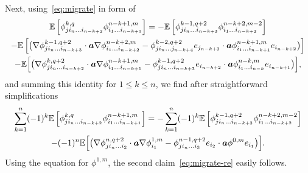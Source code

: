 \documentclass[10pt]{amsart}
\theoremstyle{plain}
\theoremstyle{definition}
\numberwithin{equation}{section}
\newcommand{\ee}{e}
\newcommand{\Aa}{\boldsymbol a}
\newcommand{\expec}[1]{\mathbb{E}\left[ #1 \right]}
\newcommand{\Bexpec}[1]{\mathbb{E}\Bigl[ #1 \Bigr]}
\begin{document}
Next, using~\eqref{eq:migrate} in form of
\begin{multline*}
\expec{\phi^{k,q}_{ji_n\ldots i_{n-k+2}}\phi^{n-k+1,m}_{i_1\ldots i_{n-k+1}}}=-\expec{\phi^{k-1,q+2}_{ji_n\ldots i_{n-k+3}}\phi^{n-k+2,m-2}_{i_1\ldots i_{n-k+2}}}\\
-\expec{\big(\nabla\phi^{k-1,q+2}_{ji_n\ldots i_{n-k+3}}\cdot\Aa\nabla\phi^{n-k+2,m}_{i_1\ldots i_{n-k+2}}-\phi^{k-2,q+2}_{ji_n\ldots j_{n-k+4}}\ee_{j_{n-k+3}}\cdot\Aa\phi^{n-k+1,m}_{i_1\ldots i_{n-k+1}}\ee_{i_{n-k+2}}\big)}\\
-\Bexpec{\big(\nabla\phi^{k,q+2}_{ji_n\ldots i_{n-k+2}}\cdot\Aa\nabla\phi^{n-k+1,m}_{i_1\ldots i_{n-k+1}}-\phi^{k-1,q+2}_{ji_n\ldots i_{n-k+3}}\ee_{i_{n-k+2}}\cdot\Aa\phi^{n-k,m}_{i_1\ldots i_{n-k}}\ee_{i_{n-k+1}}\big)},
\end{multline*}
and summing this identity for $1\le k\le n$, we find after straightforward simplifications
\begin{multline*}
\sum_{k=1}^n(-1)^k\expec{\phi^{k,q}_{ji_n\ldots i_{n-k+2}}\phi^{n-k+1,m}_{i_1\ldots i_{n-k+1}}}=-\sum_{k=1}^n(-1)^k\expec{\phi^{k-1,q+2}_{ji_n\ldots i_{n-k+3}}\phi^{n-k+2,m-2}_{i_1\ldots i_{n-k+2}}}\\
-(-1)^n\Bexpec{\big(\nabla\phi^{n,q+2}_{ji_n\ldots i_{2}}\cdot\Aa\nabla\phi^{1,m}_{i_1}-\phi^{n-1,q+2}_{ji_n\ldots i_{3}}\ee_{i_{2}}\cdot\Aa\phi^{0,m}\ee_{i_{1}}\big)}.
\end{multline*}
Using the equation for $\phi^{1,m}$, the second claim~\eqref{eq:migrate-re} easily follows.
\end{document}
